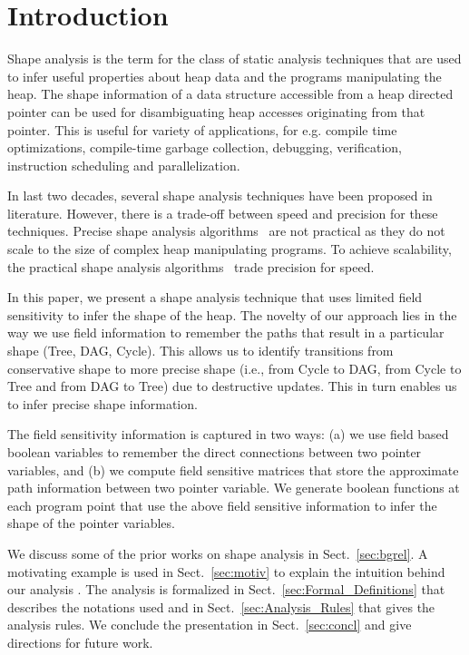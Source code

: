 \documentclass[runningheads,a4paper]{llncs}
\begin{document}
\section{Introduction}

Shape analysis is the term for the class of static analysis
techniques that are used to infer useful properties about
heap data and the programs manipulating the heap. The shape
information of a data structure accessible from a heap
directed pointer can be used for disambiguating heap accesses
originating from that pointer. This is useful for variety of
applications, for e.g. compile time optimizations,
compile-time garbage collection, debugging, verification,
instruction scheduling and parallelization.

In last two decades, several shape analysis techniques have
been proposed in literature. However, there is a trade-off
between speed and precision for these techniques. Precise
shape analysis
algorithms~\cite{Sagiv96,shaham03heap,distefano06local,hackett05region} 
are not practical as they do not scale to the size of complex
heap manipulating programs. To achieve scalability,
the practical shape analysis
algorithms~\cite{Chase90,Ghiya96,marron06static} trade
precision for speed.

In this paper, we present a shape analysis technique that
uses limited field sensitivity to infer the shape of the
heap. The novelty of our approach lies in the way we use
field information to remember the paths that result in a
particular shape (Tree, DAG, Cycle).  This allows us to
identify transitions from conservative shape to more precise
shape (i.e., from Cycle to DAG, from Cycle to Tree and from
DAG to Tree) due to destructive updates. This in turn enables
us to infer precise shape information.


The field sensitivity information is captured in two ways:
(a) we use field based boolean variables to remember the
direct connections between two pointer variables, and (b) we
compute field sensitive matrices that store the approximate
path information between two pointer variable. We generate
boolean functions at each program point that use the above
field sensitive information to infer the shape of the pointer
variables.

We discuss some of the prior works on shape analysis in
Sect.~\ref{sec:bgrel}. A motivating example is used in
Sect.~\ref{sec:motiv} to explain the intuition behind our
analysis .  The analysis is formalized in
Sect.~\ref{sec:Formal_Definitions} that describes the
notations used and in Sect.~\ref{sec:Analysis_Rules} that
gives the analysis rules.  We conclude the presentation in
Sect.~\ref{sec:concl} and give directions for future work.
\end{document}
